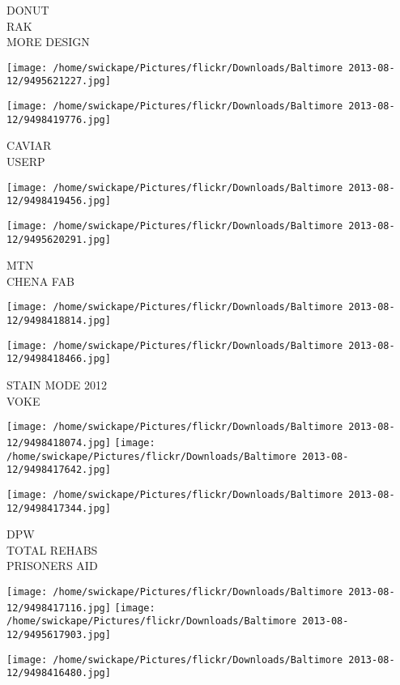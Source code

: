 \documentclass[10pt,letterpaper]{article}
\begin{document}
DONUT\\
RAK\\
MORE DESIGN
\pagebreak

\texttt{[image: /home/swickape/Pictures/flickr/Downloads/Baltimore 2013-08-12/9495621227.jpg]}

\vspace{0.25in}
\texttt{[image: /home/swickape/Pictures/flickr/Downloads/Baltimore 2013-08-12/9498419776.jpg]}

CAVIAR\\
USERP
\pagebreak

\texttt{[image: /home/swickape/Pictures/flickr/Downloads/Baltimore 2013-08-12/9498419456.jpg]}

\vspace{0.25in}
\texttt{[image: /home/swickape/Pictures/flickr/Downloads/Baltimore 2013-08-12/9495620291.jpg]}

MTN\\
CHENA FAB
\pagebreak

\texttt{[image: /home/swickape/Pictures/flickr/Downloads/Baltimore 2013-08-12/9498418814.jpg]}

\vspace{0.25in}
\texttt{[image: /home/swickape/Pictures/flickr/Downloads/Baltimore 2013-08-12/9498418466.jpg]}

STAIN MODE 2012\\
VOKE
\pagebreak

\texttt{[image: /home/swickape/Pictures/flickr/Downloads/Baltimore 2013-08-12/9498418074.jpg]}
\texttt{[image: /home/swickape/Pictures/flickr/Downloads/Baltimore 2013-08-12/9498417642.jpg]}

\vspace{0.25in}
\texttt{[image: /home/swickape/Pictures/flickr/Downloads/Baltimore 2013-08-12/9498417344.jpg]}

DPW\\
TOTAL REHABS\\
PRISONERS AID
\pagebreak

\texttt{[image: /home/swickape/Pictures/flickr/Downloads/Baltimore 2013-08-12/9498417116.jpg]}
\texttt{[image: /home/swickape/Pictures/flickr/Downloads/Baltimore 2013-08-12/9495617903.jpg]}

\texttt{[image: /home/swickape/Pictures/flickr/Downloads/Baltimore 2013-08-12/9498416480.jpg]}
\end{document}
